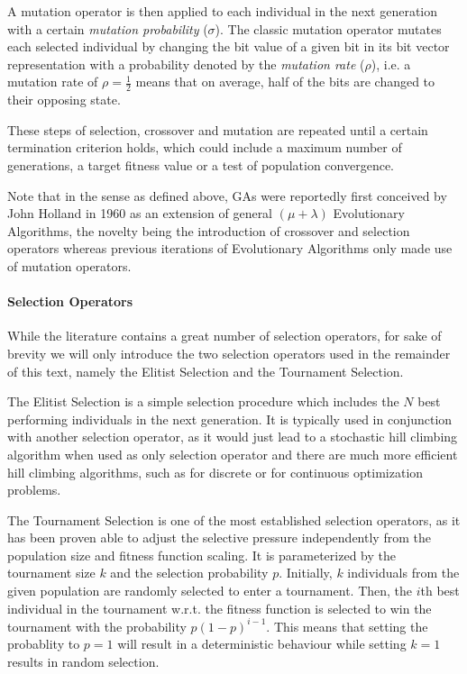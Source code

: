 A mutation operator is then applied to each individual in the next generation with a certain \emph{mutation probability} ($\sigma$).
The classic mutation operator mutates each selected individual by changing the bit value of a given bit in its bit vector representation with a probability denoted by the \emph{mutation rate} ($\rho$), i.e. a mutation rate of $\rho=\frac{1}{2}$ means that on average, half of the bits are changed to their opposing state.

These steps of selection, crossover and mutation are repeated until a certain termination criterion holds, which could include a maximum number of generations, a target fitness value or a test of population convergence.

Note that in the sense as defined above, \aclp{GA} were reportedly\cite{mitchell:1998a} first conceived by John Holland in 1960 as an extension of general $(\mu +\lambda)$ Evolutionary Algorithms, the novelty being the introduction of crossover and selection operators whereas previous iterations of Evolutionary Algorithms only made use of mutation operators.

\paragraph{Selection Operators}
While the literature contains a great number of selection operators, for sake of brevity we will only introduce the two selection operators used in the remainder of this text, namely the Elitist Selection\cite{mitchell:1998a} and the Tournament Selection\cite{miller:cs1995a}.


The Elitist Selection is a simple selection procedure which includes the $N$ best performing individuals in the next generation.
It is typically used in conjunction with another selection operator, as it would just lead to a stochastic hill climbing algorithm when used as only selection operator and there are much more efficient hill climbing algorithms, such as \cite{vaughan:ijc2005a} for discrete or \cite{altman:cm1970a} for continuous optimization problems.

The Tournament Selection is one of the most established selection operators, as it has been proven able to adjust the selective pressure independently from the population size and fitness function scaling\cite{goldberg:1990a}.
It is parameterized by the tournament size $k$ and the selection probability $p$.
Initially, $k$ individuals from the given population are randomly selected to enter a tournament.
Then, the $i$th best individual in the tournament w.r.t. the fitness function is selected to win the tournament with the probability $p(1-p)^{i-1}$.
This means that setting the probablity to $p=1$ will result in a deterministic behaviour while setting $k=1$ results in random selection.

